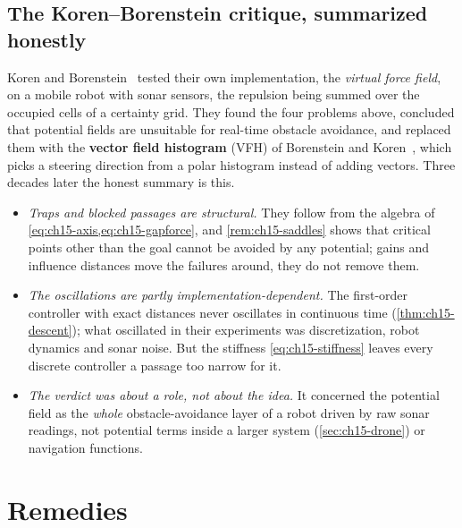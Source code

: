 \subsection{The Koren--Borenstein critique, summarized honestly}
\label{sec:ch15-koren}

Koren and Borenstein~\cite{koren1991potential} tested their own
implementation, the \emph{virtual force field}, on a mobile robot with sonar
sensors, the repulsion being summed over the occupied cells of a certainty
grid. They found the four problems above, concluded that potential fields
are unsuitable for real-time obstacle avoidance, and replaced them with the \textbf{vector field histogram} (VFH) of Borenstein and Koren~\cite{borenstein1991vfh}, which picks
a steering direction from a polar histogram instead of adding vectors. Three
decades later the honest summary is this.
\begin{itemize}
  \item \emph{Traps and blocked passages are structural.} They follow from
  the algebra of \cref{eq:ch15-axis,eq:ch15-gapforce}, and
  \cref{rem:ch15-saddles} shows that critical points other than the goal
  cannot be avoided by any potential; gains and influence distances move
  the failures around, they do not remove them.
  \item \emph{The oscillations are partly implementation-dependent.} The
  first-order controller with exact distances never oscillates in
  continuous time (\cref{thm:ch15-descent}); what oscillated in their
  experiments was discretization, robot dynamics and sonar noise. But the
  stiffness \cref{eq:ch15-stiffness} leaves every discrete controller a
  passage too narrow for it.
  \item \emph{The verdict was about a role, not about the idea.} It
  concerned the potential field as the \emph{whole} obstacle-avoidance layer
  of a robot driven by raw sonar readings, not potential terms inside a
  larger system (\cref{sec:ch15-drone}) or navigation functions.
\end{itemize}

\section{Remedies}
\label{sec:ch15-remedies}

